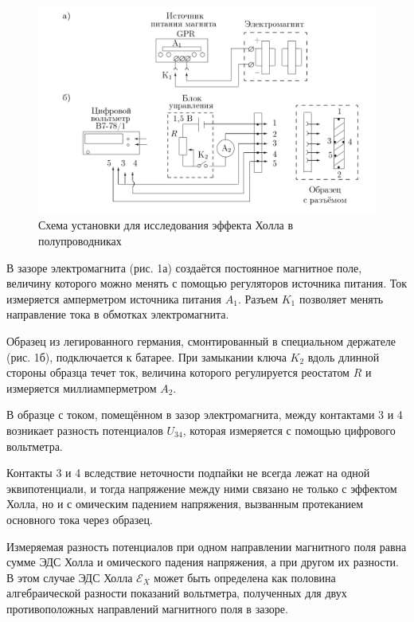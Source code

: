 \documentclass[a4paper]{article}
\theoremstyle{definition}
\theoremstyle{remark}
\begin{document}
	\begin{figure}[h!]
		\centering
		\includegraphics[width=\linewidth]{image/Holl2}
		\caption{Схема установки для исследования эффекта Холла в полупроводниках}
		\label{fig:Holl2}
	\end{figure}
  
  	В зазоре электромагнита (рис. 1а) создаётся постоянное магнитное поле, величину которого можно менять с помощью регуляторов источника питания. Ток измеряется амперметром источника питания $A_{1}$. Разъем $K_{1}$ позволяет менять направление тока в обмотках электромагнита. \medskip
  
  	Образец из легированного германия, смонтированный в специальном держателе (рис. 1б), подключается к батарее. При замыкании ключа $K_{2}$ вдоль длинной стороны образца течет ток, величина которого регулируется реостатом $R$ и измеряется миллиамперметром $A_{2}$. \medskip
  	
  	В образце с током, помещённом в зазор электромагнита, между контактами 3 и 4 возникает разность потенциалов $U_{34}$, которая измеряется с помощью цифрового вольтметра. \medskip
  	
  	Контакты 3 и 4 вследствие неточности подпайки не всегда лежат на одной
  	эквипотенциали, и тогда напряжение между ними связано не только с эффектом
  	Холла, но и с омическим падением напряжения, вызванным протеканием основного тока через образец. \medskip
  	
  	Измеряемая разность потенциалов при одном направлении
  	магнитного поля равна сумме ЭДС Холла и омического падения напряжения, а
  	при другом  их разности. В этом случае ЭДС Холла $\mathscr{E}_{X}$ может быть определена как половина алгебраической разности показаний вольтметра, полученных для
  	двух противоположных направлений магнитного поля в зазоре. \medskip
  	
\end{document}
